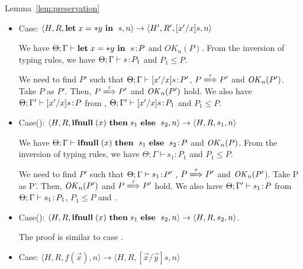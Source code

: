 \begin{pfof}{Lemma~\ref{lem:preservation}}
\begin{itemize}
  We need to find $P'$ such that \(\Theta; \Gamma' \vdash [x'/x]s\COL P'\),
  \(P \xLongrightarrow{\tau} P'\) and \(\OK_n(P')\).  Take \(P\) as
  \(P'\).  Then, \(P \xLongrightarrow{\tau} P'\) and \(\OK_n(P')\) hold.  We
  also have \(\Theta; \Gamma \vdash [x'/x]s\COL P\) from ,
  \(\Theta; \Gamma \vdash [x'/x]s\COL P_{1}\)\( P_{1} \le
  P\). 

\item Case: $\langle H, R, \mathbf{let}\; x = *y \ \mathbf{in}\; \ s, n \rangle
  \rightarrow \langle H', R', [x'/x]s, n \rangle $

  We have \(\Theta; \Gamma \vdash \mathbf{let}\; x = *y \ \mathbf{in}\; \ s\!:\!  P\) and
  \(OK_{n}(P)\). From the inversion of typing rules, we have \(\Theta;
  \Gamma \vdash s\!:\! P_{1}\) and \(P_{1} \le P\).

  We need to find \(P'\) such that \(\Theta; \Gamma \vdash [x'/x]s\!:\!
  P'\), \(P \xLongrightarrow{\tau} P'\) and \(\OK_n(P')\). Take \(P\) as
  \(P'\). Then, \(P \xLongrightarrow{\tau} P'\) and \(\OK_n(P')\) hold.  We
  also have \(\Theta; \Gamma' \vdash [x'/x]s\!:\! P\) from ,
  \(\Theta; \Gamma' \vdash [x'/x]s\!:\! P_{1}\) and \(P_{1} \le P\).
        
\item Case(): \(\langle H, R, \IFNULL \Cirx \ \THEN s_{1} \ \ELSE \ s_{2},
  n \rangle \rightarrow \langle H, R, s_{1}, n \rangle\)

  We have \(\Theta; \Gamma \vdash \mathbf{ifnull}\; (x) \ \mathbf{then}\; \ s_{1}
  \ \mathbf{else}\; \ s_{2}\!:\! P\) and \(\mathit{OK}_{n}(P)\). From the inversion of
  typing rules, we have \(\Theta; \Gamma \vdash s_{1} : P_{1}\) and \(P_{1}
  \le P\).

  We need to find $P'$ such that \(\Theta; \Gamma \vdash s_1\!:\! P'\)
  , \(P \xLongrightarrow{\tau} P'\) and \(\mathit{OK}_n(P'\)).  Take P as P'.  Then,
  \(\OK_n(P')\) and \(P \xLongrightarrow{\tau} P'\) hold. We also have \(\Theta;
  \Gamma' \vdash s_{1}\!:\! P\) from \(\Theta; \Gamma \vdash s_{1}\!:\!
  P_1\), \(P_{1} \le P\) and .

\item Case(): \(\langle H, R, \IFNULL \Cirx \ \THEN s_{1} \ \ELSE \ s_{2},
  n \rangle \rightarrow \langle H, R, s_{2}, n \rangle\).

 The proof is similar to case . 

\item Case: $\langle H, R, f(\vec{x}) , n \rangle \rightarrow  \langle H, R, [\vec{x}/\vec{y}]s, n  \rangle $


\end{itemize}
\end{pfof}
